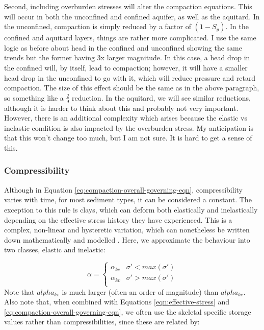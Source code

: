 \documentclass{article}
\begin{document}
Second, including overburden stresses will alter the compaction equations. This will occur in both the unconfined and confined aquifer, as well as the aquitard. In the unconfined, compaction is simply reduced by a factor of $(1-S_y)$. In the confined and aquitard layers, things are rather more complicated. I use the same logic as before about head in the confined and unconfined showing the same trends but the former having 3x larger magnitude. In this case, a head drop in the confined will, by itself, lead to compaction; however, it will have a smaller head drop in the unconfined to go with it, which will reduce pressure and retard compaction. The size of this effect should be the same as in the above paragraph, so something like a $\frac{2}{9}$ reduction. In the aquitard, we will see similar reductions, although it is harder to think about this and probably not very important. However, there is an additional complexity which arises because the elastic vs inelastic condition is also impacted by the overburden stress. My anticipation is that this won't change too much, but I am not sure. It is hard to get a sense of this. 


\subsubsection{Compressibility}

Although in Equation \ref{eq:compaction-overall-governing-eqn}, compressibility varies with time, for most sediment types, it can be considered a constant. The exception to this rule is clays, which can deform both elastically and inelastically depending on the effective stress history they have experienced. This is a complex, non-linear and hysteretic variation, which can nonetheless be written down mathematically and modelled \cite{helm_one-dimensional_1976}. Here, we approximate the behaviour into two classes, elastic and inelastic:

\begin{equation}
\label{eq:compressibility-clays}
\alpha = 
\begin{cases}
\alpha_{ke} & \sigma' < max(\sigma') \\
\alpha_{kv} & \sigma' > max(\sigma') \\
\end{cases}
\end{equation}
Note that $alpha_{kv}$ is much larger (often an order of magnitude) than $alpha_{ke}$. Also note that, when combined with Equations \ref{eqn:effective-stress} and \ref{eq:compaction-overall-governing-eqn}, we often use the skeletal specific storage values rather than compressibilities, since these are related by:
\end{document}
